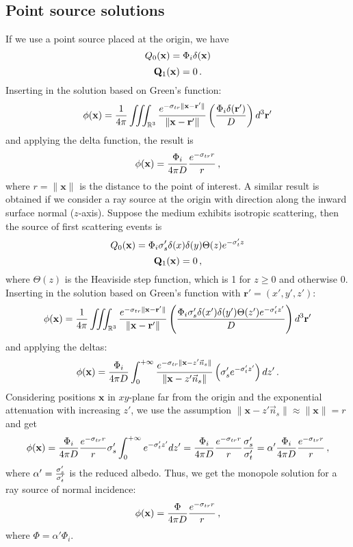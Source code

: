 \documentclass[10pt,a4paper]{article}
\begin{document}
\subsection{Point source solutions}
If we use a point source placed at the origin, we have
$$
{Q_0}(\mathbf{x}) = \Phi_i \delta(\mathbf{x})
$$
$$
\mathbf{Q}_1(\mathbf{x}) = 0 \, .
$$
Inserting in the solution based on Green's function:
$$
{\phi}(\mathbf{x}) = \frac{1}{4 \pi} \iiint_{\mathbb{R}^3} \frac{e^{-\sigma_{tr} \|\mathbf{x} - \mathbf{r}' \|}}{\|\mathbf{x} - \mathbf{r}' \|} \left(\frac{\Phi_i \delta(\mathbf{r}')}{D}\right) d^3 \mathbf{r}'
$$
and applying the delta function, the result is
$$
{\phi}(\mathbf{x}) = \frac{\Phi_i}{4 \pi D} \frac{e^{-\sigma_{tr} r}}{r} \, ,
$$
where $r = \|\mathbf{x}\|$ is the distance to the point of interest. A similar result is obtained if we consider a ray source at the origin with direction along the inward surface normal ($z$-axis). Suppose the medium exhibits isotropic scattering, then the source of first scattering events is~\cite{patterson89}
$$
{Q_0}(\mathbf{x}) = \Phi_i {\sigma}'_s \delta(x) \delta(y) \Theta(z) e^{-{\sigma}'_t z}
$$
$$
\mathbf{Q}_1(\mathbf{x}) = 0 \, ,
$$
where $\Theta(z)$ is the Heaviside step function, which is 1 for $z \geq 0$ and otherwise 0. Inserting in the solution based on Green's function with $\mathbf{r}' = (x', y', z')$:
$$
{\phi}(\mathbf{x}) = \frac{1}{4 \pi} \iiint_{\mathbb{R}^3} \frac{e^{-\sigma_{tr} \|\mathbf{x} - \mathbf{r}' \|}}{\|\mathbf{x} - \mathbf{r}' \|} \left(   \frac{\Phi_i {\sigma}'_s \delta(x') \delta(y') \Theta(z') e^{-{\sigma}'_t z'}}{D} \right) d^3 \mathbf{r}'
$$
and applying the deltas:
$$
{\phi}(\mathbf{x}) = \frac{\Phi_i}{4 \pi D} \int_{0}^{+\infty} \frac{e^{-\sigma_{tr} \|\mathbf{x} - z' \vec{n}_s \|}}{\|\mathbf{x} - z' \vec{n}_s  \|} \left(  {\sigma}'_s e^{-{\sigma}'_t z'} \right) dz' \, .
$$
Considering positions $\mathbf{x}$ in $xy$-plane far from the origin and the exponential attenuation with increasing $z'$, we use the assumption $\|\mathbf{x} - z' \vec{n}_s \| \approx \|\mathbf{x}\| = r$ and get
$$
{\phi}(\mathbf{x}) = \frac{\Phi_i}{4 \pi D} \frac{e^{-\sigma_{tr} r}}{r} {\sigma}'_s \int_{0}^{+\infty} e^{-{\sigma}'_t z'} dz' = \frac{\Phi_i}{4 \pi D} \frac{e^{-\sigma_{tr} r}}{r} \frac{{\sigma}'_s}{{\sigma}'_t} = \alpha' \frac{\Phi_i}{4 \pi D} \frac{e^{-\sigma_{tr} r}}{r} \, ,
$$
where $\alpha' = \frac{{\sigma}'_s}{{\sigma}'_t}$ is the reduced albedo. Thus, we get the monopole solution for a ray source of normal incidence:
\begin{equation} \label{eq:monopoint}
{\phi}(\mathbf{x}) = \frac{\Phi}{4 \pi D} \frac{e^{-\sigma_{tr} r}}{r} \, ,
\end{equation}
where $\Phi = \alpha' \Phi_i$.
\end{document}
